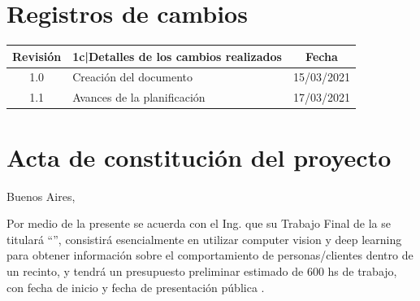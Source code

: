 \documentclass[11pt]{charter}
\begin{document}
\maketitle
\thispagestyle{empty}
\pagebreak


\thispagestyle{empty}
{\setlength{\parskip}{0pt}
\tableofcontents{}
}
\pagebreak


\section{Registros de cambios}
\label{sec:registro}


\begin{table}[ht]
\label{tab:registro}
\centering
\begin{tabularx}{\linewidth}{@{}|c|X|c|@{}}
\hline
\rowcolor[HTML]{C0C0C0} 
Revisión & {1}{c|}{\cellcolor[HTML]{C0C0C0}Detalles de los cambios realizados} & Fecha      \\ \hline
1.0      & Creación del documento                                          & 15/03/2021 \\ \hline
1.1      & Avances de la planificación & 17/03/2021 \\ \hline
\end{tabularx}
\end{table}

\pagebreak



\section{Acta de constitución del proyecto}
\label{sec:acta}

\begin{flushright}
Buenos Aires, \fechaInicioName
\end{flushright}

\vspace{2cm}

Por medio de la presente se acuerda con el Ing. \authorname\hspace{1px} que su Trabajo Final de la \degreename\hspace{1px} se titulará ``\ttitle'', consistirá esencialmente en utilizar computer vision y deep learning para obtener información sobre el comportamiento de personas/clientes dentro de un recinto, y tendrá un presupuesto preliminar estimado de 600 hs de trabajo, con fecha de inicio \fechaInicioName\hspace{1px} y fecha de presentación pública \fechaFinalName.
\end{document}
